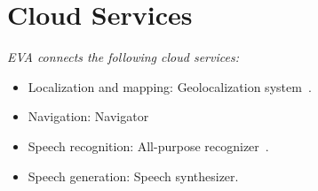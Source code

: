 \section*{Cloud Services}

\textit{EVA connects the following cloud services:}
\begin{itemize}
	\item Localization and mapping: \BnL{} Geolocalization system~\cite{bnl3}.
	\item Navigation: \BnL{} Navigator
	\item Speech recognition: \BnL{} All-purpose recognizer~\cite{bnl1}.
	\item Speech generation: \BnL{} Speech synthesizer.
\end{itemize}
